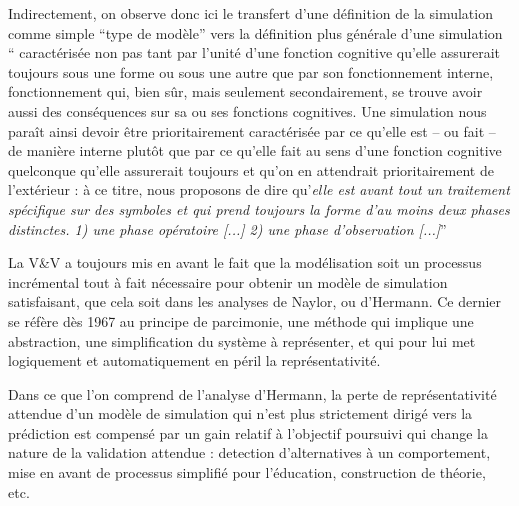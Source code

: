 Indirectement, on observe donc ici le transfert d'une définition de la simulation comme simple \enquote{type de modèle} vers la définition plus générale d'une simulation \enquote{ caractérisée non pas tant par l’unité d’une fonction cognitive qu’elle assurerait toujours sous une forme ou sous une autre que par son fonctionnement interne, fonctionnement qui, bien sûr, mais seulement secondairement, se trouve avoir aussi des conséquences sur sa ou ses fonctions cognitives. Une simulation nous paraît ainsi devoir être prioritairement caractérisée par ce qu’elle est – ou fait – de manière interne plutôt que par ce qu’elle fait au sens d’une fonction cognitive quelconque qu’elle assurerait toujours et qu’on en attendrait prioritairement de l’extérieur : à ce titre, nous proposons de dire qu’\textit{elle est avant tout un traitement spécifique sur des symboles et qui prend toujours la forme d'au moins deux phases distinctes. 1) une phase opératoire [...] 2) une phase d'observation [...]}} \autocite[33-34]{Varenne2013}

La V\&V a toujours mis en avant le fait que la modélisation soit un processus incrémental tout à fait nécessaire pour obtenir un modèle de simulation satisfaisant, que cela soit dans les analyses de Naylor, ou d'Hermann. Ce dernier se réfère dès 1967 au principe de parcimonie, une méthode qui implique une abstraction, une simplification du système à représenter, et qui pour lui met logiquement et automatiquement en péril la représentativité.  



Dans ce que l'on comprend de l'analyse d'Hermann, la perte de représentativité attendue d'un modèle de simulation qui n'est plus strictement dirigé vers la prédiction est compensé par un gain relatif à l'objectif poursuivi qui change la nature de la validation attendue : detection d'alternatives à un comportement, mise en avant de processus simplifié pour l'éducation, construction de théorie, etc.

